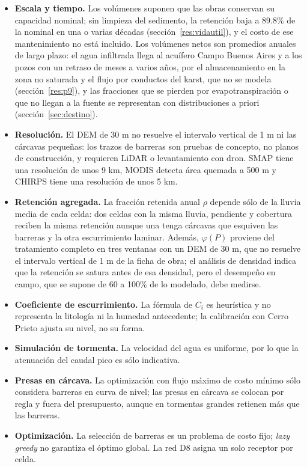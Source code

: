 \documentclass[11pt,letterpaper]{article}
\begin{document}
\begin{itemize}
  \item \textbf{Escala y tiempo.} Los volúmenes suponen que las obras conservan su capacidad nominal; sin limpieza del sedimento, la retención baja a 89.8\% de la nominal en una o varias décadas (sección~\ref{res:vidautil}), y el costo de ese mantenimiento no está incluido. Los volúmenes netos son promedios anuales de largo plazo: el agua infiltrada llega al acuífero Campo Buenos Aires y a los pozos con un retraso de meses a varios años, por el almacenamiento en la zona no saturada y el flujo por conductos del karst, que no se modela (sección~\ref{res:p9}), y las fracciones que se pierden por evapotranspiración o que no llegan a la fuente se representan con distribuciones a priori (sección~\ref{sec:destino}).
  \item \textbf{Resolución.} El DEM de 30 m no resuelve el intervalo vertical de 1 m ni las cárcavas pequeñas: los trazos de barreras son pruebas de concepto, no planos de construcción, y requieren LiDAR o levantamiento con dron. SMAP tiene una resolución de unos 9 km, MODIS detecta área quemada a 500 m y CHIRPS tiene una resolución de unos 5 km.
  \item \textbf{Retención agregada.} La fracción retenida anual $\rho$ depende sólo de la lluvia media de cada celda: dos celdas con la misma lluvia, pendiente y cobertura reciben la misma retención aunque una tenga cárcavas que esquiven las barreras y la otra escurrimiento laminar. Además, $\varphi(P)$ proviene del tratamiento completo en tres ventanas con un DEM de 30 m, que no resuelve el intervalo vertical de 1 m de la ficha de obra; el análisis de densidad indica que la retención se satura antes de esa densidad, pero el desempeño en campo, que se supone de 60 a 100\% de lo modelado, debe medirse.
  \item \textbf{Coeficiente de escurrimiento.} La fórmula de $C_i$ es heurística y no representa la litología ni la humedad antecedente; la calibración con Cerro Prieto ajusta su nivel, no su forma.
  \item \textbf{Simulación de tormenta.} La velocidad del agua es uniforme, por lo que la atenuación del caudal pico es sólo indicativa.
  \item \textbf{Presas en cárcava.} La optimización con flujo máximo de costo mínimo sólo considera barreras en curva de nivel; las presas en cárcava se colocan por regla y fuera del presupuesto, aunque en tormentas grandes retienen más que las barreras.
  \item \textbf{Optimización.} La selección de barreras es un problema de costo fijo; \emph{lazy greedy} no garantiza el óptimo global. La red D8 asigna un solo receptor por celda.

\end{itemize}
\end{document}
